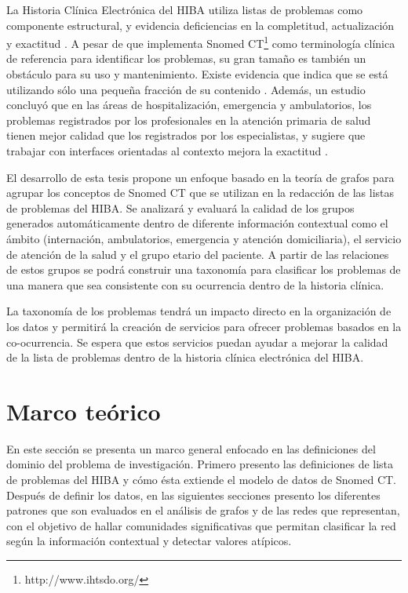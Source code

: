 La Historia Clínica Electrónica del \acrfull{HIBA} utiliza  listas de problemas como componente estructural, y evidencia deficiencias en la completitud, actualización y exactitud \cite{Otero2014}. A pesar de que implementa Snomed CT\footnote{http://www.ihtsdo.org/} como terminología clínica de referencia para identificar los problemas, su gran tamaño es también un obstáculo para su uso y mantenimiento. Existe evidencia que indica que se está utilizando sólo una pequeña fracción de su contenido \cite{Lezcano2011}. Además, un estudio concluyó que en las áreas de hospitalización, emergencia y ambulatorios, los problemas registrados por los profesionales en la atención primaria de salud tienen mejor calidad que los registrados por los especialistas, y sugiere que trabajar con interfaces orientadas al contexto mejora la exactitud \cite{Luna2013}. 
 
El desarrollo de esta tesis propone un enfoque basado en la teoría de grafos para agrupar los conceptos de Snomed CT que se utilizan en la redacción de las listas de problemas del \acrshort{HIBA}. Se analizará y evaluará la calidad de los grupos generados automáticamente dentro de diferente información contextual como el ámbito (internación, ambulatorios, emergencia y atención domiciliaria), el servicio de atención de la salud y el grupo etario del paciente. A partir de las relaciones de estos grupos se podrá construir una taxonomía para clasificar los problemas de una manera que sea consistente con su ocurrencia dentro de la historia clínica.
 
La taxonomía  de los problemas tendrá un impacto directo en la organización de los datos y permitirá la creación de servicios para ofrecer problemas basados en la co-ocurrencia. Se espera que estos servicios puedan ayudar a mejorar la calidad de la lista de problemas dentro de la historia clínica electrónica del \acrshort{HIBA}.

\section{Marco teórico}
En este sección se presenta un marco general enfocado en las definiciones del dominio del problema de investigación. Primero presento las definiciones de lista de problemas del \acrshort{HIBA} y cómo ésta extiende el modelo de datos de Snomed CT. Después de definir los datos, en las siguientes secciones presento los diferentes patrones que son evaluados en el análisis de grafos y de las redes que representan, con el objetivo de hallar comunidades significativas que permitan clasificar la red según la información contextual y detectar valores atípicos. 

